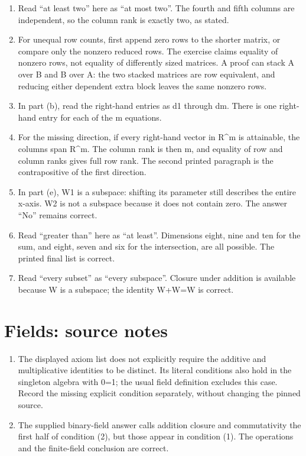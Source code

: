 \begin{enumerate}
\item Read “at least two” here as “at most two”. The fourth and fifth columns are independent, so the column rank is exactly two, as stated.
\item For unequal row counts, first append zero rows to the shorter matrix, or compare only the nonzero reduced rows. The exercise claims equality of nonzero rows, not equality of differently sized matrices. A proof can stack A over B and B over A: the two stacked matrices are row equivalent, and reducing either dependent extra block leaves the same nonzero rows.
\item In part (b), read the right-hand entries as d1 through dm. There is one right-hand entry for each of the m equations.
\item For the missing direction, if every right-hand vector in R\textasciicircum{}m is attainable, the columns span R\textasciicircum{}m. The column rank is then m, and equality of row and column ranks gives full row rank. The second printed paragraph is the contrapositive of the first direction.
\item In part (e), W1 is a subspace: shifting its parameter still describes the entire x-axis. W2 is not a subspace because it does not contain zero. The answer “No” remains correct.
\item Read “greater than” here as “at least”. Dimensions eight, nine and ten for the sum, and eight, seven and six for the intersection, are all possible. The printed final list is correct.
\item Read “every subset” as “every subspace”. Closure under addition is available because W is a subspace; the identity W+W=W is correct.
\end{enumerate}
\section*{Fields: source notes}
\begin{enumerate}
\item The displayed axiom list does not explicitly require the additive and multiplicative identities to be distinct. Its literal conditions also hold in the singleton algebra with 0=1; the usual field definition excludes this case. Record the missing explicit condition separately, without changing the pinned source.
\item The supplied binary-field answer calls addition closure and commutativity the first half of condition (2), but those appear in condition (1). The operations and the finite-field conclusion are correct.
\end{enumerate}
